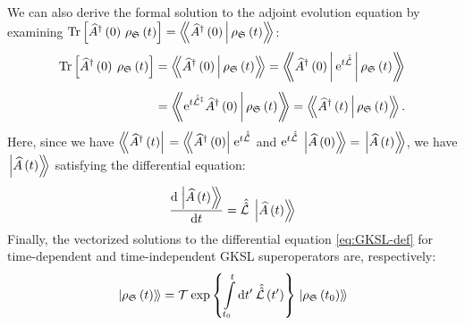 \documentclass[preprints,article,accept,moreauthors,pdftex]{Definitions/mdpi}
\begin{document}
\begin{paracol}{2}
\switchcolumn
\noindent We can also derive the formal solution to the adjoint evolution equation by examining $\mathrm{Tr}\left[\widehat{A}^{\dagger}\left(0\right)\,\rho_{\mathfrak{S}}\left(t\right)\right] = \left\langle\!\!\Braket{\widehat{A}^{\dagger}\left(0\right)|\rho_{\mathfrak{S}}\left(t\right)}\!\!\right\rangle$:
\begin{equation}
    \label{eq:vect-op-ev}
    \begin{split}
        \mathrm{Tr}\left[\widehat{A}^{\dagger}\left(0\right)\:\rho_{\mathfrak{S}}\left(t\right)\right] &= \left\langle\!\!\Braket{\widehat{A}^{\dagger}\left(0\right)|\rho_{\mathfrak{S}}\left(t\right)}\!\!\right\rangle = \left\langle\!\!\!\Braket{\widehat{A}^{\dagger}\left(0\right)|\mathrm{e}^{t\hat{\hat{\mathcal{L}}}}|\rho_{\mathfrak{S}}\left(t\right)}\!\!\!\right\rangle \\[4pt]
        &= \left\langle\!\!\!\Braket{\mathrm{e}^{t\hat{\hat{\mathcal{L}}}^{\ddagger}}\widehat{A}^{\dagger}\left(0\right)|\rho_{\mathfrak{S}}\left(t\right)}\!\!\!\right\rangle = \left\langle\!\!\Braket{\widehat{A}^{\dagger}\left(t\right)|\rho_{\mathfrak{S}}\left(t\right)}\!\!\right\rangle.
    \end{split}
\end{equation}
Here, since we have $\left\langle\!\!\bra{\widehat{A}^{\dagger}\left(t\right)}\right. = \left\langle\!\!\bra{\widehat{A}^{\dagger}\left(0\right)}\right.\mathrm{e}^{t\hat{\hat{\mathcal{L}}}}$ and $\mathrm{e}^{t\hat{\hat{\mathcal{L}}}}\,\left.\ket{\widehat{A}\left(0\right)}\!\!\right\rangle = \left.\ket{\widehat{A}\left(t\right)}\!\!\right\rangle$, we have $\left.\ket{\widehat{A}\left(t\right)}\!\!\right\rangle$ satisfying the differential equation:
\begin{equation}
    \label{eq:adjoint-LvN-eq}
    \frac{\mathrm{d}\left.\ket{\widehat{A}\left(t\right)}\!\!\right\rangle}{\mathrm{d}t} = \hat{\hat{\mathcal{L}}}\,\left.\ket{\widehat{A}\left(t\right)}\!\!\right\rangle
\end{equation}
Finally, the vectorized solutions to the differential equation \eqref{eq:GKSL-def} for time-dependent and time-independent GKSL superoperators are, respectively:
\begin{subequations}
    \label{eq:GKSL-vec-sol}
    \begin{align}
        \label{eq:GKSL-vec-sol-time-dep}
        \left.\ket{\rho_\mathfrak{S}\left(t\right)}\!\right\rangle &= \mathcal{T}\:\mathrm{exp}\left\{\int\limits_{t_{0}}^{t}\mathrm{d}t'\:\hat{\hat{\mathcal{L}}}\left(t'\right)\right\} \left.\ket{\rho_\mathfrak{S}\left(t_{0}\right)}\!\right\rangle \\[4pt]

\end{align}
\end{subequations}
\end{paracol}
\end{document}
